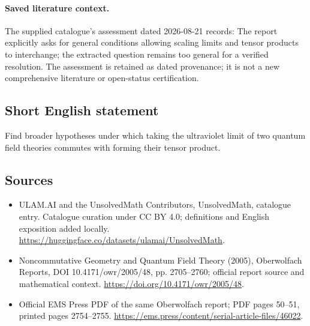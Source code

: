 \documentclass[11pt]{article}
\begin{document}
\paragraph{Saved literature context.} The supplied catalogue's assessment dated 2026-08-21 records: The report explicitly asks for general conditions allowing scaling limits and tensor products to interchange; the extracted question remains too general for a verified resolution. The assessment is retained as dated provenance; it is not a new comprehensive literature or open-status certification.
\subsection{Short English statement}
Find broader hypotheses under which taking the ultraviolet limit of two quantum field theories commutes with forming their tensor product.
\subsection{Sources}
\begin{itemize}
\item[\hypertarget{source:statement:1}{S1}] ULAM.AI and the UnsolvedMath Contributors, UnsolvedMath, catalogue entry. Catalogue curation under CC BY 4.0; definitions and English exposition added locally.
\url{https://huggingface.co/datasets/ulamai/UnsolvedMath}.
\item[\hypertarget{source:statement:2}{S2}] Noncommutative Geometry and Quantum Field Theory (2005), Oberwolfach Reports, DOI 10.4171/owr/2005/48, pp. 2705--2760; official report source and mathematical context.
\url{https://doi.org/10.4171/owr/2005/48}.
\item[\hypertarget{source:statement:3}{S3}] Official EMS Press PDF of the same Oberwolfach report; PDF pages 50--51, printed pages 2754--2755.
\url{https://ems.press/content/serial-article-files/46022}.
\end{itemize}
\label{end:statement}
\end{document}

